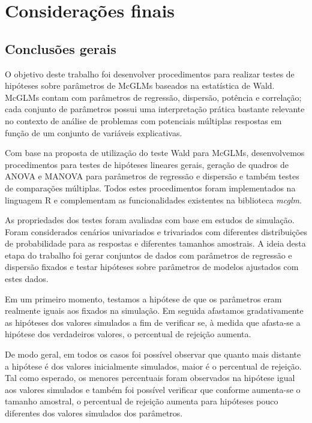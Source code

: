 
\chapter{Considerações finais}\label{cap:conclusao}


\section{Conclusões gerais}

O objetivo deste trabalho foi desenvolver procedimentos para realizar testes de hipóteses sobre parâmetros de McGLMs baseados na estatística de Wald. McGLMs contam com parâmetros de regressão, dispersão, potência e correlação; cada conjunto de parâmetros possui uma interpretação prática bastante relevante no contexto de análise de problemas com potenciais múltiplas respostas em função de um conjunto de variáveis explicativas.

Com base na proposta de utilização do teste Wald para McGLMs, desenvolvemos procedimentos para testes de hipóteses lineares gerais, geração de quadros de ANOVA e MANOVA para parâmetros de regressão e dispersão e também testes de comparações múltiplas. Todos estes procedimentos foram implementados na linguagem R e complementam as funcionalidades existentes na biblioteca \emph{mcglm}.

As propriedades dos testes foram avaliadas com base em estudos de simulação. Foram considerados cenários univariados e trivariados com diferentes distribuições de probabilidade para as respostas e diferentes tamanhos amostrais. A ideia desta etapa do trabalho foi gerar conjuntos de dados com parâmetros de regressão e dispersão fixados e testar hipóteses sobre parâmetros de modelos ajustados com estes dados. 

Em um primeiro momento, testamos a hipótese de que os parâmetros eram realmente iguais aos fixados na simulação. Em seguida afastamos gradativamente as hipóteses dos valores simulados a fim de verificar se, à medida que afasta-se a hipótese dos verdadeiros valores, o percentual de rejeição aumenta. 

De modo geral, em todos os casos foi possível observar que quanto mais distante a hipótese é dos valores inicialmente simulados, maior é o percentual de rejeição. Tal como esperado, os menores percentuais foram observados na hipótese igual aos valores simulados e também foi possível verificar que conforme aumenta-se o tamanho amostral, o percentual de rejeição aumenta para hipóteses pouco diferentes dos valores simulados dos parâmetros.

